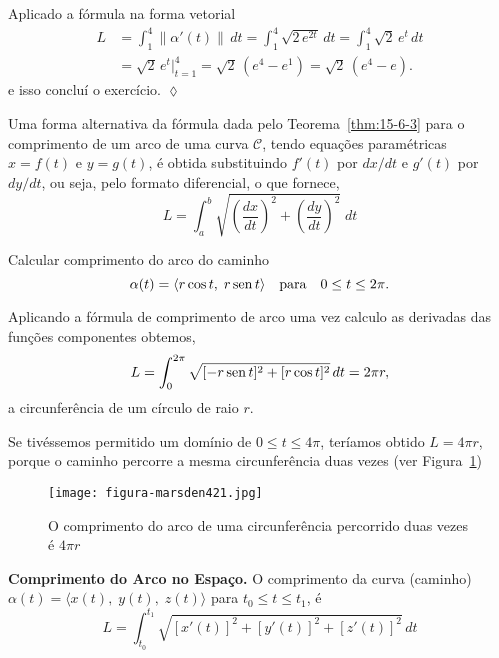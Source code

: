 Aplicado a fórmula na forma vetorial
\begin{align*}
L&= \int_{1}^{4}\|\alpha'(t)\|\, dt=\int_{1}^{4}\sqrt{ 2\,e^{2t}}\, dt=\int_{1}^{4}\sqrt{2}\,e^{t}\, dt\\[2ex]
&= \sqrt{2}\,e^{t}\Bigg\vert_{t=1}^{4}=\sqrt{2}\,\left(e^{4}-e^{1}\right)=\sqrt{2}\,\left(e^{4}-e\right).
\end{align*}
 e isso concluí o exercício. \hfill \(\lozenge\)


Uma forma alternativa da fórmula dada pelo Teorema~\ref{thm:15-6-3} para o comprimento de um arco de uma curva \(\mathcal{C}\), tendo equações paramétricas \(x = f(t)\) e \(y = g(t)\), é obtida substituindo \(f'(t)\) por \(dx/ dt\) e \(g'(t)\) por \(dy/dt\), ou seja, pelo formato diferencial, o que fornece,
\begin{equation*}
L=\int_{a}^{b}\sqrt{\left( \frac{dx}{dt}\right)^{2}+\left(\frac{dy}{dt}\right)^{2}}\;dt
\end{equation*}


\begin{exc}
Calcular comprimento do arco do caminho
\begin{equation*}
\alpha(t) =\langle r \cos t,\; r \operatorname{sen} t \rangle \quad \text{para} \quad 0 \leq t \leq 2\pi.
\end{equation*}
\end{exc}

\solo
Aplicando a fórmula de comprimento de arco uma vez calculo as derivadas das funções componentes obtemos,
\begin{equation*}
L =\int_{0}^{2\pi}\sqrt{[-r \operatorname{sen} t]^{2} + [r\cos t]^{2}} \, dt = 2\pi r,
\end{equation*}
a circunferência de um círculo de raio \(r\).

Se tivéssemos permitido um domínio de \(0 \leq t \leq 4\pi\), teríamos obtido \(L=4\pi r\), porque o caminho
percorre a mesma circunferência duas vezes (ver Figura~\ref{fig:421})

\begin{figure}[H]
  \centering
  \texttt{[image: figura-marsden421.jpg]}
  \caption{O comprimento do arco de uma circunferência percorrido duas vezes é \(4\pi r\)}\label{fig:421}
\end{figure}

\bigskip
\noindent\textbf{Comprimento do Arco no Espaço.}
O comprimento da curva (caminho)  \(\alpha(t) =\langle x(t),\; y (t),\; z (t)\rangle \) para \(t_{0} \leq t \leq t_{1}\), é
\begin{equation*}
L=\int_{t_{0}}^{t_{1}}\sqrt{[x'(t)]^{2}+[y'(t)]^{2}+[z'(t)]^{2}}\, dt
\end{equation*}

